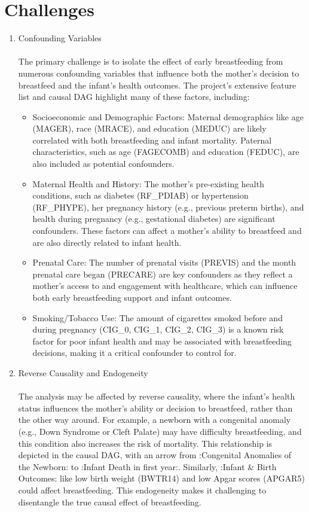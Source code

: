 \documentclass[a4paper,12pt]{article} %
\begin{document}
\section{Challenges}

\begin{enumerate}
    \item Confounding Variables \\\\
    The primary challenge is to isolate the effect of early breastfeeding from numerous confounding variables that influence both the mother's decision to breastfeed and the infant's health outcomes. The project's extensive feature list and causal DAG highlight many of these factors, including:
        \begin{itemize}
            \item Socioeconomic and Demographic Factors: Maternal demographics like age (MAGER), race (MRACE), and education (MEDUC) are likely correlated with both breastfeeding and infant mortality. Paternal characteristics, such as age (FAGECOMB) and education (FEDUC), are also included as potential confounders.
            \item Maternal Health and History: The mother's pre-existing health conditions, such as diabetes (RF\_PDIAB) or hypertension (RF\_PHYPE), her pregnancy history (e.g., previous preterm births), and health during pregnancy (e.g., gestational diabetes) are significant confounders. These factors can affect a mother's ability to breastfeed and are also directly related to infant health.
            \item Prenatal Care: The number of prenatal visits (PREVIS) and the month prenatal care began (PRECARE) are key confounders as they reflect a mother's access to and engagement with healthcare, which can influence both early breastfeeding support and infant outcomes.
            \item Smoking/Tobacco Use: The amount of cigarettes smoked before and during pregnancy (CIG\_0, CIG\_1, CIG\_2, CIG\_3) is a known risk factor for poor infant health and may be associated with breastfeeding decisions, making it a critical confounder to control for.
        \end{itemize}
    \item Reverse Causality and Endogeneity\\\\
        The analysis may be affected by reverse causality, where the infant's health status influences the mother's ability or decision to breastfeed, rather than the other way around. For example, a newborn with a congenital anomaly (e.g., Down Syndrome or Cleft Palate) may have difficulty breastfeeding, and this condition also increases the risk of mortality. This relationship is depicted in the causal DAG, with an arrow from :Congenital Anomalies of the Newborn: to :Infant Death in first year:. Similarly, :Infant \& Birth Outcomes: like low birth weight (BWTR14) and low Apgar scores (APGAR5) could affect breastfeeding. This endogeneity makes it challenging to disentangle the true causal effect of breastfeeding.  

\end{enumerate}
\end{document}
